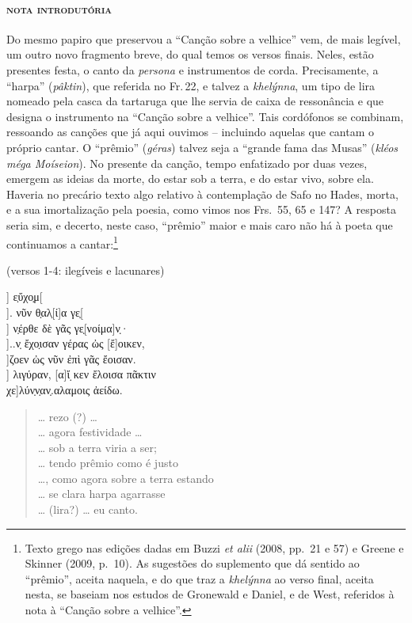 \paragraph{\textsc{nota introdutória}}
Do mesmo papiro que preservou a ``Canção sobre a velhice'' vem, de mais legível, um outro novo fragmento breve, do qual temos os versos finais. Neles, estão presentes festa, o canto da \textit{persona} e instrumentos de corda. Precisamente, a ``harpa'' (\textit{pâktin}), que referida no Fr.\,22, e talvez a \textit{khelýnna}, um tipo de lira nomeado pela casca da tartaruga que lhe servia de caixa de ressonância e que designa o instrumento na ``Canção sobre a velhice''.
Tais cordófonos se combinam, ressoando as canções que já aqui ouvimos -- incluindo aquelas que cantam o próprio cantar. O ``prêmio'' (\textit{géras}) talvez seja a ``grande fama das Musas'' (\textit{kléos méga Moíseion}). No presente da canção, tempo enfatizado por duas vezes, emergem as ideias da morte, do estar sob a terra, e do estar vivo, sobre ela. Haveria no precário texto algo relativo à contemplação de Safo no Hades, morta, e a sua imortalização pela poesia, como vimos nos Frs.~55, 65 e 147? A resposta seria sim, e decerto, neste caso, ``prêmio'' maior e mais caro não há à poeta que continuamos a cantar:\footnote{Texto grego nas edições dadas em Buzzi \textit{et alii} (2008, pp.~21 e 57) e Greene e Skinner (2009, p.~10). As sugestões do suplemento que dá sentido ao ``prêmio'', aceita naquela, e do que traz a \textit{khelýnna} ao verso final, aceita nesta, se baseiam nos estudos de Gronewald e Daniel, e de West, referidos à nota à ``Canção sobre a velhice''.}

\pagebreak

\begin{gkverse}
\textnormal{(versos 1-4: ilegíveis e lacunares)}

      ] ε̣ὔχο̣μ[\\
]. νῦν θ̣αλ̣[ί]α γε̣[\\
] ν̣έρθε δὲ γᾶς γε̣[νοίμα]ν̣·\\
]..ν̣ ἔχο̣ισαν γέρας ὠς [ἔ]οικεν,\\
]ζοεν ὠς νῦν ἐπὶ γᾶς ἔοισαν.\\
] λιγύραν, [α]ἴ ̣κεν ἔλοισα πᾶκτιν\\
        χε]λύν̣ν̣αν̣.αλαμοις ἀείδω. 
\end{gkverse}

\begin{verse}
\ldots{} rezo (?) \ldots{}\\
\ldots{} agora festividade \ldots{}\\
\ldots{} sob a terra viria a ser;\\
\ldots{} tendo prêmio como é justo\\
\ldots{}, como agora sobre a terra estando\\ 
\ldots{} se clara harpa agarrasse\\
\ldots{} (lira?) \ldots{} eu canto.
\end{verse}


